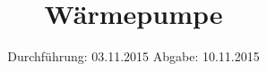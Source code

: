 

\subject{206}
\title{Wärmepumpe}
\date{
  Durchführung: 03.11.2015
  \hspace{3em}
  Abgabe: 10.11.2015
}



\maketitle
\thispagestyle{empty}
\tableofcontents
\newpage





\nocite{*}
\printbibliography



